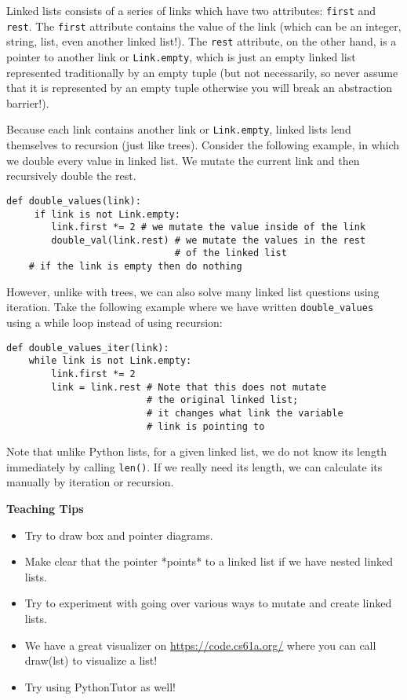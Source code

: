 \begin{blocksection}
Linked lists consists of a series of links which have two attributes: \lstinline{first} and \lstinline{rest}. The \lstinline{first} attribute contains the value of the link (which can be an integer, string, list, even another linked list!). The \lstinline{rest} attribute, on the other hand, is a pointer to another link or \lstinline{Link.empty}, which is just an empty linked list represented traditionally by an empty tuple (but not necessarily, so never assume that it is represented by an empty tuple otherwise you will break an abstraction barrier!).

Because each link contains another link or \lstinline{Link.empty}, linked lists lend themselves to recursion (just like trees). Consider the following example, in which we double every value in linked list. We mutate the current link and then recursively double the rest. 
\vspace{1.5mm}
\begin{lstlisting}
def double_values(link): 
     if link is not Link.empty:
        link.first *= 2 # we mutate the value inside of the link
        double_val(link.rest) # we mutate the values in the rest 
                              # of the linked list
    # if the link is empty then do nothing
\end{lstlisting}

However, unlike with trees, we can also solve many linked list questions using iteration. Take the following example where we have written \lstinline{double_values} using a while loop instead of using recursion:
\vspace{1.5mm}
\begin{lstlisting}
def double_values_iter(link):
    while link is not Link.empty:
        link.first *= 2
        link = link.rest # Note that this does not mutate 
                         # the original linked list; 
                         # it changes what link the variable 
                         # link is pointing to
\end{lstlisting}

Note that unlike Python lists, for a given linked list, we do not know its length immediately by calling \lstinline{len()}. If we really need its length, we can calculate its manually by iteration or recursion. 
\end{blocksection}

\begin{guide}
    \textbf{Teaching Tips}
    \begin{itemize}
       \item Try to draw box and pointer diagrams.
       \item Make clear that the pointer *points* to a linked list if we have nested linked lists.
       \item Try to experiment with going over various ways to mutate and create linked lists. 
       \item We have a great visualizer on \url{https://code.cs61a.org/} where you can call draw(lst) to visualize a list! 
       \item Try using PythonTutor as well!
    \end{itemize}
 \end{guide}